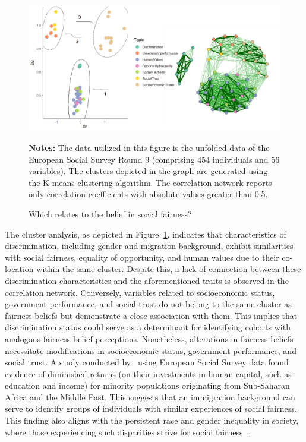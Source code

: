 \begin{figure}[h!]
	\centering
	\includegraphics[width=1\linewidth]{figs/fig4}
	\caption{Which relates to the belief in social fairness?}
	\label{fig:fig4}
	\begin{minipage}{1\linewidth}
		\vspace{0.2cm}
		\footnotesize
		\textbf{Notes:}	The data utilized in this figure is the unfolded data of the European Social Survey Round 9 (comprising 454 individuals and 56 variables). The clusters depicted in the graph are generated using the K-means clustering algorithm. The correlation network reports only correlation coefficients with absolute values greater than 0.5.
	\end{minipage}
\end{figure}

The cluster analysis, as depicted in Figure~\ref{fig:fig4}, indicates that characteristics of discrimination, including gender and migration background, exhibit similarities with social fairness, equality of opportunity, and human values due to their co-location within the same cluster. Despite this, a lack of connection between these discrimination characteristics and the aforementioned traits is observed in the correlation network. Conversely, variables related to socioeconomic status, government performance, and social trust do not belong to the same cluster as fairness beliefs but demonstrate a close association with them. This implies that discrimination status could serve as a determinant for identifying cohorts with analogous fairness belief perceptions. Nonetheless, alterations in fairness beliefs necessitate modifications in socioeconomic status, government performance, and social trust. A study conducted by~\citet{bakhtiari2022diminished} using European Social Survey data found evidence of diminished returns (on their investments in human capital, such as education and income) for minority populations originating from Sub-Saharan Africa and the Middle East. This suggests that an immigration background can serve to identify groups of individuals with similar experiences of social fairness. This finding also aligns with the persistent race and gender inequality in society, where those experiencing such disparities strive for social fairness~\citep{becares2015understanding}.


